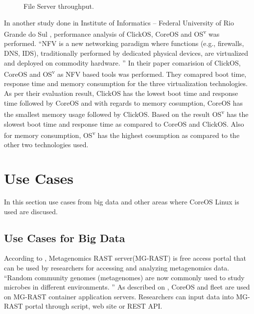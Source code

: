 \documentclass[9pt,twocolumn,twoside]{../../styles/osajnl}
\begin{document}
\begin{figure}[htbp]
\centering
{}
\caption{File Server throughput. \cite{julian2016containers} }
\label{fig:false-color}
\end{figure}

In another study done in Institute of Informatics – Federal University
of Rio Grande do Sul \cite{2016NFVSolutions}, performance analysis of
ClickOS, CoreOS and OS\textsuperscript{v} was performed. “NFV is a new
networking paradigm where functions (e.g., firewalls, DNS, IDS),
traditionally performed by dedicated physical devices, are virtualized
and deployed on commodity hardware. ” In their paper comarision of
ClickOS, CoreOS and OS\textsuperscript{v} as NFV based tools was
performed. They comapred boot time, response time and memory
consumption for the three virtualization technologies. As per their
evaluation result, ClickOS has the lowest boot time and response time
followed by CoreOS and with regards to memory cosumption, CoreOS has
the smallest memory usage followed by ClickOS. Based on the result
OS\textsuperscript{v} has the slowest boot time and response time as
compared to CoreOS and ClickOS. Also for memory consumption,
OS\textsuperscript{v} has the highest cosumption as compared to the
other two technologies used.

\section{Use Cases}

In this section use cases from big data and other areas where CoreOS
Linux is used are discused.

\subsection{Use Cases  for Big Data}

According to \cite{meyer2008metagenomics} , Metagenomics RAST
server(MG-RAST) is free access portal that can be used by researchers
for accessing and analyzing metagenomics data. “Random community
genomes (metagenomes) are now commonly used to study microbes in
different environments. ” As described on \cite{wilke2016mg}, CoreOS and
fleet are used on MG-RAST container application servers. Researchers
can input data into MG-RAST portal through script, web site or REST
API.
\end{document}
